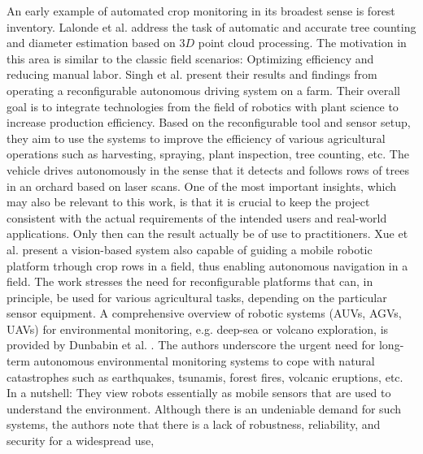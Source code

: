 \documentclass[english, master, utf8]{base/thesis_KBS}
\begin{document}
\noindent
An early example of automated crop monitoring in its broadest sense is forest inventory. Lalonde et al. \cite{Lalonde:2006} address the task of automatic and accurate tree counting and
diameter estimation based on $3D$ point cloud processing. The motivation in this area is similar to the classic field scenarios: Optimizing efficiency and reducing manual labor.\newline
Singh et al. \cite{Singh:2010} present their results and findings from operating a reconfigurable autonomous driving system on a farm. Their overall goal is to integrate technologies
from the field of robotics with plant science to increase production efficiency. Based on the reconfigurable tool and sensor setup, they aim to use the systems to improve the
efficiency of various agricultural operations such as harvesting, spraying, plant inspection, tree counting, etc. The vehicle drives autonomously in the sense that it detects and
follows rows of trees in an orchard based on laser scans. One of the most important insights, which may also be relevant to this work, is that it is crucial to keep the project
consistent with the actual requirements of the intended users and real-world applications. Only then can the result actually be of use to practitioners.\newline
Xue et al. \cite{Xue:2010} present a vision-based system also capable of guiding a mobile robotic platform trhough crop rows in a field, thus enabling autonomous navigation
in a field. The work stresses the need for reconfigurable platforms that can, in principle, be used for various agricultural tasks, depending on the particular sensor equipment.
\newline
A comprehensive overview of robotic systems (AUVs, AGVs, UAVs) for environmental monitoring, e.g. deep-sea or volcano exploration, is provided by Dunbabin et al. \cite{Dunbabin:2012}.
The authors underscore the urgent need for long-term autonomous environmental monitoring systems to cope with natural catastrophes such as earthquakes, tsunamis, forest fires, volcanic
eruptions, etc. In a nutshell:  \cite{Dunbabin:2012} They view robots essentially as mobile sensors that are used to understand
the environment. Although there is an undeniable demand for such systems, the authors note that there is a lack of robustness, reliability, and security for a widespread use,
\end{document}
